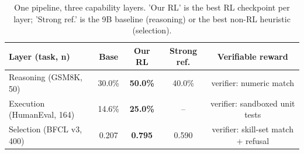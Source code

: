 
\begin{table}[t]
  \centering
  \caption{One pipeline, three capability layers. 'Our RL' is the best RL checkpoint per layer; 'Strong ref.' is the 9B baseline (reasoning) or the best non-RL heuristic (selection).}
  \label{tab:main}
  \begin{tabular}{lcccc}
    \toprule
    Layer (task, n) & Base & Our RL & Strong ref. & Verifiable reward \\
    \midrule
    Reasoning (GSM8K, 50) & 30.0\% & \textbf{50.0\%} & 40.0\% & verifier: numeric match \\
    Execution (HumanEval, 164) & 14.6\% & \textbf{25.0\%} & -- & verifier: sandboxed unit tests \\
    Selection (BFCL v3, 400) & 0.207 & \textbf{0.795} & 0.590 & verifier: skill-set match + refusal \\
    \bottomrule
  \end{tabular}
\end{table}
